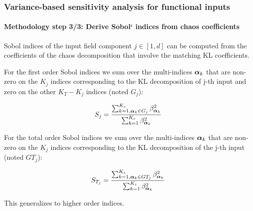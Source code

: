\documentclass[aspectratio=169]{beamer}
\begin{document}
\begin{frame}
\frametitle{Variance-based sensitivity analysis for functional inputs}

\framesubtitle{Methodology step 3/3: Derive Sobol` indices from chaos coefficients}

Sobol indices of the input field component $j \in [1,d]$ can be computed
from the coefficients of the chaos decomposition that involve the
matching KL coefficients.

For the first order Sobol indices we sum over the multi-indices ${\mathbf{\boldsymbol{{\alpha}}}}_k$
that are non-zero on the $K_j$ indices corresponding to the KL
decomposition of j-th input and zero on the other $K_T - K_j$ indices (noted $G_j$):

$$
S_j = \frac{\sum_{k=1, {\mathbf{\boldsymbol{{\alpha}}}}_k \in G_j}^{K_c} \beta_{{\mathbf{\boldsymbol{{\alpha}}}}_k}^2}{\sum_{k=1}^{K_c} \beta_{{\mathbf{\boldsymbol{{\alpha}}}}_k}^2}
$$

For the total order Sobol indices we sum over the multi-indices ${\mathbf{\boldsymbol{{\alpha}}}}_k$
that are non-zero on the $K_j$ indices corresponding to the KL
decomposition of the j-th input (noted $GT_j$):

$$
S_{T_j} = \frac{\sum_{k=1, {\mathbf{\boldsymbol{{\alpha}}}}_k \in GT_j}^{K_c} \beta_{{\mathbf{\boldsymbol{{\alpha}}}}_k}^2}{\sum_{k=1}^{K_c} \beta_{{\mathbf{\boldsymbol{{\alpha}}}}_k}^2} 
$$

This generalizes to higher order indices.

\end{frame}
\end{document}
